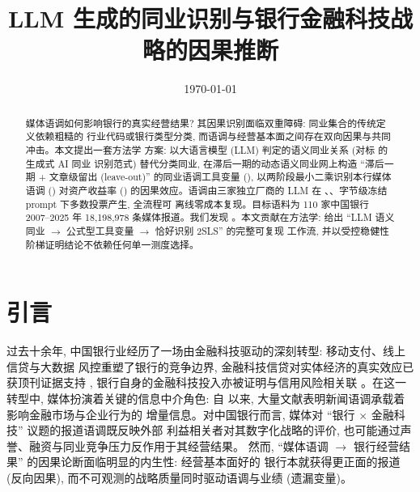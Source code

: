 




\title{LLM 生成的同业识别与银行金融科技战略的因果推断}
\author{}
\date{\today}


\maketitle

\begin{abstract}
媒体语调如何影响银行的真实经营结果? 其因果识别面临双重障碍: 同业集合的传统定义依赖粗糙的
行业代码或银行类型分类, 而语调与经营基本面之间存在双向因果与共同冲击。本文提出一套方法学
方案: 以大语言模型 (LLM) 判定的语义同业关系 (对标 \textcite{cao2025genai} 的生成式 AI 同业
识别范式) 替代分类同业, 在滞后一期的动态语义同业网上构造 ``滞后一期 + 文章级留出
(leave-out)'' 的同业语调工具变量
(), 以两阶段最小二乘识别本行媒体语调
() 对资产收益率 () 的因果效应。语调由三家独立厂商的
LLM 在 、、字节级冻结 prompt 下多数投票产生, 全流程可
离线零成本复现。目标语料为 110 家中国银行 2007--2025 年 18{,}198{,}978 条媒体报道。我们发现
。本文贡献在方法学:
给出 ``LLM 语义同业 $\rightarrow$ 公式型工具变量 $\rightarrow$ 恰好识别 2SLS'' 的完整可复现
工作流, 并以受控稳健性阶梯证明结论不依赖任何单一测度选择。
\end{abstract}

\section{引言}\label{sec:intro}

过去十余年, 中国银行业经历了一场由金融科技驱动的深刻转型: 移动支付、线上信贷与大数据
风控重塑了银行的竞争边界, 金融科技信贷对实体经济的真实效应已获顶刊证据支持
\parencite{hau2024fintechcredit}, 银行自身的金融科技投入亦被证明与信用风险相关联
\parencite{cheng2020bankfintech}。在这一转型中, 媒体扮演着关键的信息中介角色:
自 \textcite{tetlock2007media} 以来, 大量文献表明新闻语调承载着影响金融市场与企业行为的
增量信息。对中国银行而言, 媒体对 ``银行 $\times$ 金融科技'' 议题的报道语调既反映外部
利益相关者对其数字化战略的评价, 也可能通过声誉、融资与同业竞争压力反作用于其经营结果。
然而, ``媒体语调 $\rightarrow$ 银行经营结果'' 的因果论断面临明显的内生性: 经营基本面好的
银行本就获得更正面的报道 (反向因果), 而不可观测的战略质量同时驱动语调与业绩 (遗漏变量)。

